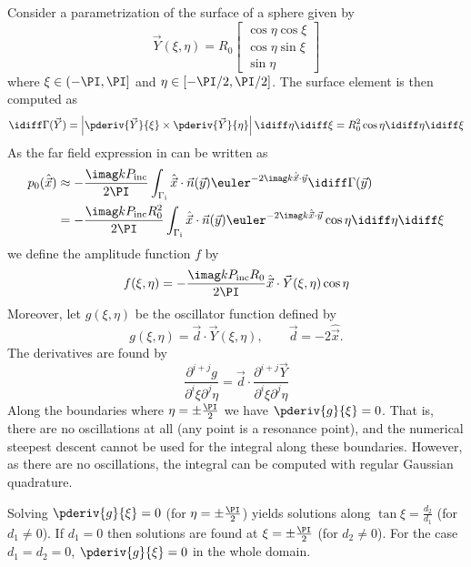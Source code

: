 Consider a parametrization of the surface of a sphere given by
\begin{equation*}
	\vec{Y}(\xi,\eta) = R_0\begin{bmatrix}
		\cos\eta\cos\xi\\
		\cos\eta\sin\xi\\
		\sin\eta
	\end{bmatrix}
\end{equation*}
where $\xi\in(-\PI,\PI]$ and $\eta\in[-\PI/2,\PI/2]$. The surface element is then computed as
\begin{equation*}
	\idiff \Gamma(\vec{Y}) = \left|\pderiv{\vec{Y}}{\xi}\times\pderiv{\vec{Y}}{\eta}\right|\idiff\eta\idiff\xi = R_0^2\cos\eta\idiff\eta\idiff\xi
\end{equation*}
As the far field expression in  can be written as
\begin{align}\label{Eq4:integrandS1}
	p_0(\hat{\vec{x}}) &\approx -\frac{\imag kP_{\mathrm{inc}}}{2\PI}\int_{\Gamma_{\mathrm{i}}} \hat{\vec{x}}\cdot\vec{n}(\vec{y}) \euler^{-2\imag k \hat{\vec{x}}\cdot\vec{y}}\idiff \Gamma(\vec{y})\\
	&= -\frac{\imag kP_{\mathrm{inc}}R_0^2}{2\PI}\int_{\Gamma_{\mathrm{i}}}\hat{\vec{x}}\cdot\vec{n}(\vec{y}) \euler^{-2\imag k \hat{\vec{x}}\cdot\vec{y}}\cos\eta\idiff\eta\idiff\xi
\end{align}
we define the amplitude function $f$ by
\begin{equation*}
	f(\xi,\eta) = -\frac{\imag kP_{\mathrm{inc}}R_0}{2\PI}\hat{\vec{x}}\cdot\vec{Y}(\xi,\eta)\cos\eta
\end{equation*}
Moreover, let $g(\xi,\eta)$ be the oscillator function defined by
\begin{equation*}
	g(\xi,\eta) = \vec{d}\cdot \vec{Y}(\xi,\eta),\qquad \vec{d}=-2\hat{\vec{x}}.
\end{equation*}
The derivatives are found by
\begin{equation*}
\frac{\partial^{i+j}g}{\partial^i \xi \partial^j \eta} = \vec{d}\cdot \frac{\partial^{i+j}\vec{Y}}{\partial^i \xi \partial^j \eta}
\end{equation*}
Along the boundaries where $\eta=\pm\frac{\PI}{2}$ we have $\pderiv{g}{\xi} = 0$. That is, there are no oscillations at all (any point is a resonance point), and the numerical steepest descent cannot be used for the integral along these boundaries. However, as there are no oscillations, the integral can be computed with regular Gaussian quadrature.

Solving $\pderiv{g}{\xi}=0$ (for $\eta=\pm\frac{\PI}{2}$) yields solutions along $\tan\xi = \frac{d_2}{d_1}$ (for $d_1\neq 0$). If $d_1=0$ then solutions are found at $\xi=\pm\frac{\PI}{2}$ (for $d_2\neq 0$). For the case $d_1=d_2=0$, $\pderiv{g}{\xi}=0$ in the whole domain.

